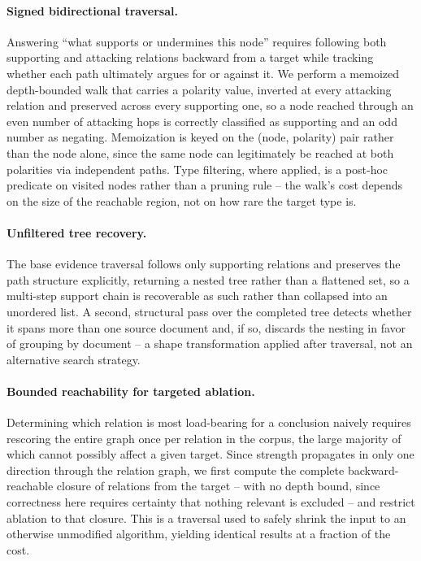 \documentclass{article}
\begin{document}
\paragraph{Signed bidirectional traversal.} Answering ``what supports or
undermines this node'' requires following both supporting and attacking
relations backward from a target while tracking whether each path
ultimately argues for or against it. We perform a memoized depth-bounded
walk that carries a polarity value, inverted at every attacking relation and
preserved across every supporting one, so a node reached through an even
number of attacking hops is correctly classified as supporting and an odd
number as negating. Memoization is keyed on the (node, polarity) pair rather
than the node alone, since the same node can legitimately be reached at both
polarities via independent paths. Type filtering, where applied, is a
post-hoc predicate on visited nodes rather than a pruning rule -- the walk's
cost depends on the size of the reachable region, not on how rare the
target type is.

\paragraph{Unfiltered tree recovery.} The base evidence traversal follows
only supporting relations and preserves the path structure explicitly,
returning a nested tree rather than a flattened set, so a multi-step
support chain is recoverable as such rather than collapsed into an
unordered list. A second, structural pass over the completed tree detects
whether it spans more than one source document and, if so, discards the
nesting in favor of grouping by document -- a shape transformation applied
after traversal, not an alternative search strategy.

\paragraph{Bounded reachability for targeted ablation.} Determining which relation is most load-bearing for a conclusion naively requires rescoring the entire graph once per relation in the corpus, the large majority of which cannot possibly affect a given target. Since strength propagates in only one direction through the relation graph, we first compute the complete backward-reachable closure of relations from the target -- with no depth bound, since correctness here requires certainty that nothing relevant is excluded -- and restrict ablation to that closure. This is a traversal used to safely shrink the input to an otherwise unmodified algorithm, yielding identical results at a fraction of the cost.
\end{document}
